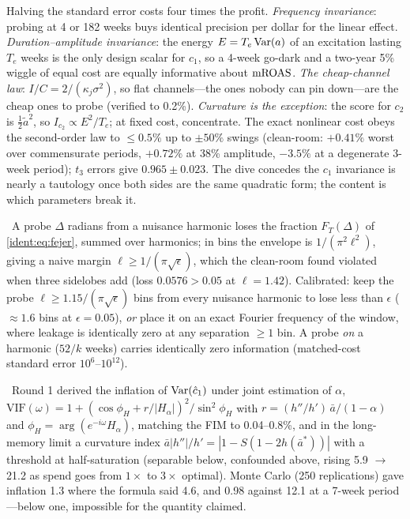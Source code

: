 Halving the standard error costs four times the profit. \emph{Frequency invariance}: probing at 4 or 182 weeks buys identical precision per dollar for the linear effect. \emph{Duration--amplitude invariance}: the energy $E = T_e\operatorname{Var}(a)$ of an excitation lasting $T_e$ weeks is the only design scalar for $c_1$, so a 4-week go-dark and a two-year 5\% wiggle of equal cost are equally informative about $\mathrm{mROAS}$. \emph{The cheap-channel law}: $I/C = 2/(\kappa_j\sigma^2)$, so flat channels---the ones nobody can pin down---are the cheap ones to probe (verified to 0.2\%). \emph{Curvature is the exception}: the score for $c_2$ is $\tfrac12\tilde a^2$, so $I_{c_2} \propto E^2/T_e$; at fixed cost, concentrate. The exact nonlinear cost obeys the second-order law to $\le 0.5\%$ up to $\pm50\%$ swings (clean-room: $+0.41\%$ worst over commensurate periods, $+0.72\%$ at 38\% amplitude, $-3.5\%$ at a degenerate 3-week period); $t_3$ errors give $0.965 \pm 0.023$. The dive concedes the $c_1$ invariance is nearly a tautology once both sides are the same quadratic form; the content is which parameters break it.

\begin{law}
\label{ident:law:ruleL}
\tagEstablished\ A probe $\Delta$ radians from a nuisance harmonic loses the fraction $F_T(\Delta)$ of \cref{ident:eq:fejer}, summed over harmonics; in bins the envelope is $1/(\pi^2\ell^2)$, giving a naive margin $\ell \ge 1/(\pi\sqrt\epsilon)$, which the clean-room found violated when three sidelobes add (loss $0.0576 > 0.05$ at $\ell = 1.42$). Calibrated: keep the probe $\ell \ge 1.15/(\pi\sqrt\epsilon)$ bins from every nuisance harmonic to lose less than $\epsilon$ ($\approx 1.6$ bins at $\epsilon = 0.05$), \emph{or} place it on an exact Fourier frequency of the window, where leakage is identically zero at any separation $\ge 1$ bin. A probe \emph{on} a harmonic ($52/k$ weeks) carries identically zero information (matched-cost standard error $10^6$--$10^{12}$).
\end{law}

\begin{proposition}
\label{ident:prop:refutedVIF}
\tagRefuted\ Round 1 derived the inflation of $\operatorname{Var}(\hat c_1)$ under joint estimation of $\alpha$, $\mathrm{VIF}(\omega) = 1 + (\cos\phi_H + r/|H_\alpha|)^2/\sin^2\phi_H$ with $r = (h''/h')\,\bar a/(1-\alpha)$ and $\phi_H = \arg(e^{-i\omega}H_\alpha)$, matching the FIM to 0.04--0.8\%, and in the long-memory limit a curvature index $\bar a|h''|/h' = |1 - S(1-2h(\bar a^*))|$ with a threshold at half-saturation (separable below, confounded above, rising 5.9 $\to$ 21.2 as spend goes from $1\times$ to $3\times$ optimal). Monte Carlo (250 replications) gave inflation 1.3 where the formula said 4.6, and 0.98 against 12.1 at a 7-week period---below one, impossible for the quantity claimed.
\end{proposition}

